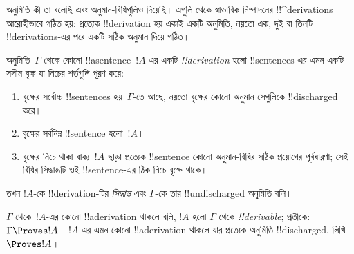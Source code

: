 \documentclass[../../../include/open-logic-section]{subfiles}
\begin{document}
      {}
      {}


\begin{explain}
অনুমিতি কী তা বলেছি এবং অনুমান-বিধিগুলিও দিয়েছি। এগুলি থেকে
স্বাভাবিক নিষ্পাদনের !!^{derivation}s আরোহীভাবে গঠিত হয়: প্রত্যেক
!!{derivation} হয় একাই একটি অনুমিতি, নয়তো এক, দুই বা তিনটি
!!{derivation}s-এর পরে একটি সঠিক অনুমান দিয়ে গঠিত।
\end{explain}

\begin{defn}[!!^{derivation}]
অনুমিতি~$\Gamma$ থেকে কোনো !!a{sentence}~$!A$-এর একটি
\emph{!!{derivation}} হলো !!{sentence}s-এর এমন একটি সসীম বৃক্ষ যা
নিচের শর্তগুলি পূরণ করে:
\begin{enumerate}
\item বৃক্ষের সর্বোচ্চ !!{sentence}s হয়~$\Gamma$-তে আছে, নয়তো
  বৃক্ষের কোনো অনুমান সেগুলিকে !!{discharged} করে।
\item বৃক্ষের সর্বনিম্ন !!{sentence} হলো~$!A$।
\item বৃক্ষের নিচে থাকা বাক্য~$!A$ ছাড়া প্রত্যেক !!{sentence} কোনো
  অনুমান-বিধির সঠিক প্রয়োগের পূর্বধারণা; সেই বিধির সিদ্ধান্তটি ওই
  !!{sentence}-এর ঠিক নিচে বৃক্ষে থাকে।
\end{enumerate}
তখন $!A$-কে !!{derivation}-টির \emph{সিদ্ধান্ত} এবং $\Gamma$-কে তার
!!{undischarged} অনুমিতি বলি।

$\Gamma$ থেকে~$!A$-এর কোনো !!a{derivation} থাকলে বলি, $!A$ হলো
$\Gamma$ থেকে \emph{!!{derivable}}; প্রতীকে: $\Gamma \Proves
!A$। $!A$-এর এমন কোনো !!a{derivation} থাকলে যার প্রত্যেক অনুমিতি
!!{discharged}, লিখি~$\Proves !A$।
\end{defn}
\end{document}
